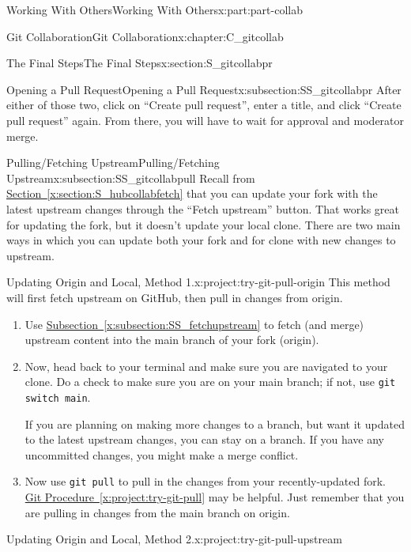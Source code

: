 \documentclass[oneside,10pt,]{book}
\newcommand{\xreffont}{\relax}
\newcommand{\mono}[1]{\texttt{#1}}
\begin{document}
\begin{partptx}{Working With Others}{}{Working With Others}{}{}{x:part:part-collab}
\begin{chapterptx}{Git Collaboration}{}{Git Collaboration}{}{}{x:chapter:C_gitcollab}
\begin{sectionptx}{The Final Steps}{}{The Final Steps}{}{}{x:section:S_gitcollabpr}
\begin{subsectionptx}{Opening a Pull Request}{}{Opening a Pull Request}{}{}{x:subsection:SS_gitcollabpr}
After either of those two, click on ``Create pull request'', enter a title, and click ``Create pull request'' again. From there, you will have to wait for approval and moderator merge.%
\end{subsectionptx}
%
%
\typeout{************************************************}
\typeout{************************************************}
%
\begin{subsectionptx}{Pulling\slash{}Fetching Upstream}{}{Pulling\slash{}Fetching Upstream}{}{}{x:subsection:SS_gitcollabpull}
%
%
%
%
%
Recall from \hyperref[x:section:S_hubcollabfetch]{Section~{\xreffont\ref{x:section:S_hubcollabfetch}}} that you can update your fork with the latest upstream changes through the ``Fetch upstream'' button. That works great for updating the fork, but it doesn't update your local clone. There are two main ways in which you can update both your fork and for clone with new changes to upstream.%
\begin{project}{Updating Origin and Local, Method 1.}{x:project:try-git-pull-origin}%
%
%
%
%
This method will first fetch upstream on GitHub, then pull in changes from origin.%
\begin{enumerate}[font=\bfseries,label=(\alph*),ref=\alph*]
\item{}Use \hyperref[x:subsection:SS_fetchupstream]{Subsection~{\xreffont\ref{x:subsection:SS_fetchupstream}}} to fetch (and merge) upstream content into the main branch of your fork (origin).%
\item{}Now, head back to your terminal and make sure you are navigated to your clone. Do a check to make sure you are on your main branch; if not, use \mono{git switch main}.%
\par
If you are planning on making more changes to a branch, but want it updated to the latest upstream changes, you can stay on a branch. If you have any uncommitted changes, you might make a merge conflict.%
\item{}Now use \mono{git pull} to pull in the changes from your recently-updated fork. \hyperref[x:project:try-git-pull]{Git Procedure~{\xreffont\ref{x:project:try-git-pull}}} may be helpful. Just remember that you are pulling in changes from the main branch on origin.%
\end{enumerate}
\end{project}%
\begin{project}{Updating Origin and Local, Method 2.}{x:project:try-git-pull-upstream}%

\end{project}
\end{subsectionptx}
\end{sectionptx}
\end{chapterptx}
\end{partptx}
\end{document}
